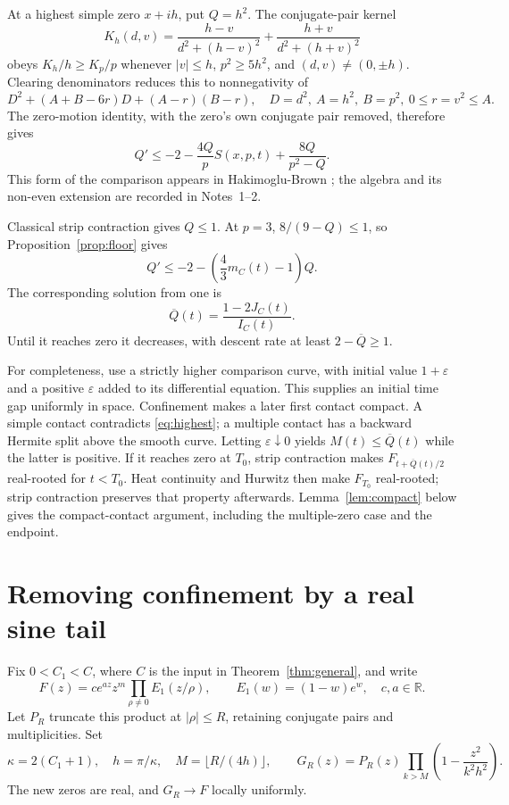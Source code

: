 \documentclass[11pt]{article}
\theoremstyle{remark}\newtheorem{remark}[theorem]{Remark}
\begin{document}
At a highest simple zero $x+ih$, put $Q=h^2$. The conjugate-pair kernel
\[ K_h(d,v)=\frac{h-v}{d^2+(h-v)^2}
                 +\frac{h+v}{d^2+(h+v)^2} \]
obeys $K_h/h\ge K_p/p$ whenever $|v|\le h$, $p^2\ge5h^2$,
and $(d,v)\ne(0,\pm h)$.
Clearing denominators reduces this to nonnegativity of
\[ D^2+(A+B-6r)D+(A-r)(B-r),\quad
D=d^2,\ A=h^2,\ B=p^2,\ 0\le r=v^2\le A. \]
The zero-motion identity, with the zero's own conjugate pair removed,
therefore gives
\begin{equation}
 Q'\le-2-\frac{4Q}{p}S(x,p,t)+\frac{8Q}{p^2-Q}.
 \label{eq:highest}
\end{equation}
This form of the comparison appears in Hakimoglu-Brown \cite{hb}; the
algebra and its non-even extension are recorded in Notes~1--2.

Classical strip contraction gives $Q\le1$. At $p=3$,
$8/(9-Q)\le1$, so Proposition~\ref{prop:floor} gives
\[ Q'\le-2-\left(\frac43m_C(t)-1\right)Q. \]
The corresponding solution from one is
\begin{equation}
 \overline Q(t)=\frac{1-2J_C(t)}{I_C(t)}.\label{eq:qbar}
\end{equation}
Until it reaches zero it decreases, with descent rate at least
$2-\overline Q\ge1$.

For completeness, use a strictly higher comparison curve, with initial
value $1+\varepsilon$ and a positive $\varepsilon$ added to its
differential equation. This supplies an initial time gap uniformly in
space. Confinement makes a later first contact compact. A simple contact
contradicts \eqref{eq:highest}; a multiple contact has a backward Hermite
split above the smooth curve. Letting $\varepsilon\downarrow0$ yields
$M(t)\le\overline Q(t)$ while the latter is positive. If it reaches zero
at $T_0$, strip contraction makes $F_{t+\overline Q(t)/2}$ real-rooted for
$t<T_0$. Heat continuity and Hurwitz then make $F_{T_0}$ real-rooted;
strip contraction preserves that property afterwards.
Lemma~\ref{lem:compact} below gives the compact-contact argument,
including the multiple-zero case and the endpoint.

\section{Removing confinement by a real sine tail}\label{sec:approx}
Fix $0<C_1<C$, where $C$ is the input in
Theorem~\ref{thm:general}, and write
\[F(z)=c e^{az}z^m\prod_{\rho\ne0}E_1(z/\rho),\qquad
 E_1(w)=(1-w)e^w,\quad c,a\in\mathbb R.\]
Let $P_R$ truncate this product at $|\rho|\le R$, retaining conjugate
pairs and multiplicities. Set
\begin{equation}
 \kappa=2(C_1+1),\quad h=\pi/\kappa,\quad M=\lfloor R/(4h)\rfloor,
 \qquad G_R(z)=P_R(z)\prod_{k>M}\left(1-\frac{z^2}{k^2h^2}\right).
 \label{eq:approx}
\end{equation}
The new zeros are real, and $G_R\to F$ locally uniformly.
\end{document}
